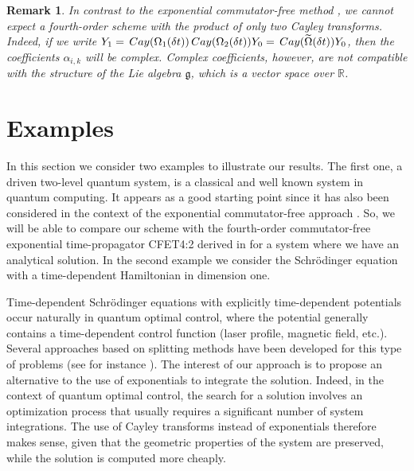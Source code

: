 \documentclass{article}
\newtheorem{remark}{Remark}
\newcommand{\Cay}{\,{\rm Cay}}
\newcommand{\Om}{\Omega}
\begin{document}
{\begin{remark}
In contrast to the exponential commutator-free method \cite{AF:2011}, we cannot expect a fourth-order scheme with the product of only two Cayley transforms. Indeed, if we write 
$Y_1 = \Cay(\Om_1(\delta t)) \Cay(\Om_2(\delta t))Y_0 = \Cay(\widetilde \Om(\delta t))Y_0$, then the coefficients $\alpha_{i,k}$ will be complex. Complex coefficients, however, are not compatible with the structure of the Lie algebra $\mathfrak g$, which is a vector space over $\mathbb R$.
\end{remark}




\section{Examples}
\label{sec:Examples}

In this section we consider two examples to illustrate our results. The first one, a driven two-level quantum system, is a classical and well known system in quantum computing. It appears as a good starting point since it has also been considered in the context of the exponential commutator-free approach \cite{AF:2011}. So, we will be able to compare our scheme with the fourth-order commutator-free exponential time-propagator CFET4:2 derived in \cite{AF:2011} for a system where we have an analytical solution. 
%
In the second example we consider the Schrödinger equation with a time-dependent Hamiltonian in dimension one. 

%
Time-dependent Schrödinger equations with explicitly time-dependent potentials occur naturally in quantum optimal control, where the potential generally contains a time-dependent control function (laser profile, magnetic field, etc.). Several approaches based on splitting methods have been developed for this type of problems (see for instance \cite{BCM2008, IKP, Pranav2019}). The interest of our approach is to propose an alternative to the use of exponentials to integrate the solution. 
%
Indeed, in the context of quantum optimal control, the search for a solution involves an optimization process that usually requires a significant number of system integrations. The use of Cayley transforms instead of exponentials therefore makes sense, given that the geometric properties of the system are preserved, while the solution is computed more cheaply. 
%

}
\end{document}
